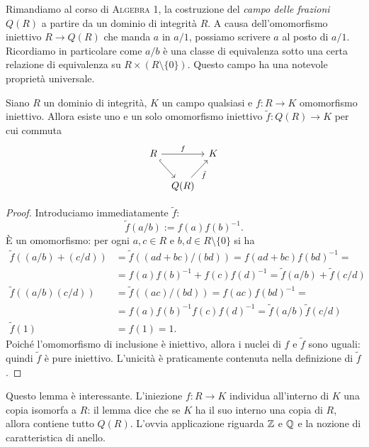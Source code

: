 Rimandiamo al corso di {\scshape Algebra 1}, la costruzione del {\em campo delle frazioni} \(Q(R)\) a partire da un dominio di integrità \(R\). A causa dell'omomorfismo iniettivo \(R \to Q(R)\) che manda \(a\) in \(a/1\), possiamo scrivere \(a\) al posto di \(a/1\). Ricordiamo in particolare come \(a/b\) è una classe di equivalenza sotto una certa relazione di equivalenza su \(R \times (R \setminus \{0\})\). Questo campo ha una notevole proprietà universale.


\begin{lemm}\label{lemm:CampoFrazioni}
Siano \(R\) un dominio di integrità, \(K\) un campo qualsiasi e \(f : R \to K\) omomorfismo iniettivo. Allora esiste uno e un solo omomorfismo iniettivo \(\tilde f : Q(R) \to K\) per cui commuta
\[\begin{tikzcd}[column sep=tiny]
R \ar[hookrightarrow, dr, swap] \ar["f", rr] & & K \\
 & Q(R) \ar["{\tilde f}", ur, swap]
\end{tikzcd}\]
\end{lemm}

\begin{proof}
Introduciamo immediatamente \(\tilde f\):
\[\tilde f(a/b) := f(a)f(b)^{-1} .\]
È un omomorfismo: per ogni \(a, c \in R\) e \(b, d \in R \setminus \{0\}\) si ha
\begin{align*}
\tilde{f}((a/b)+(c/d)) &= \tilde{f}((ad+bc)/(bd))=f(ad+bc)f(bd)^{-1}= \\
                       &= f(a)f(b)^{-1}+f(c)f(d)^{-1} =\tilde{f}(a/b)+\tilde{f}(c/d) \\
\tilde{f}((a/b)(c/d))  &=\tilde{f}((ac)/(bd))=f(ac)f(bd)^{-1}= \\
                       &= f(a)f(b)^{-1}f(c)f(d)^{-1}=\tilde{f}(a/b)\tilde{f}(c/d) \\
\tilde{f}(1)    &= f(1)=1 .        
\end{align*}
Poiché l'omomorfismo di inclusione è iniettivo, allora i nuclei di \(f\) e \(\tilde f\) sono uguali: quindi \(\tilde f\) è pure iniettivo. L'unicità è praticamente contenuta nella definizione di \(\tilde f\).
\end{proof}

Questo lemma è interessante. L'iniezione \(f : R \to K\) individua all'interno di \(K\) una copia isomorfa a \(R\): il lemma dice che se \(K\) ha il suo interno una copia di \(R\), allora contiene tutto \(Q(R)\). L'ovvia applicazione riguarda \(\mathbb{Z}\) e \(\mathbb{Q}\) e la nozione di caratteristica di anello.

